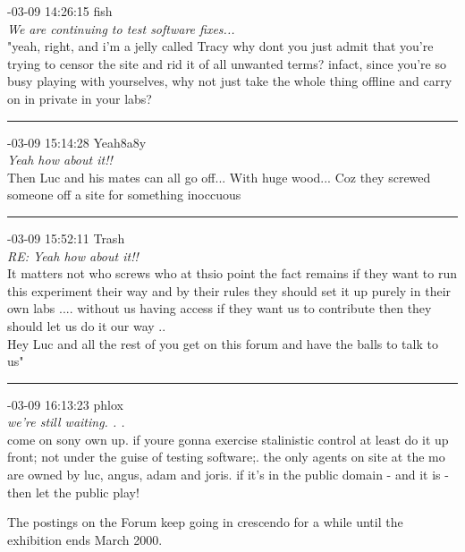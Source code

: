 \begin{mail}
{-03-09 14:26:15 fish}\\
{\itshape We are continuing to test software fixes...}\\
"yeah, right, and i'm a jelly called Tracy
why dont you just admit that you're trying to censor the site and rid it of all unwanted terms? infact, since you're so busy playing with yourselves, why not just take the whole thing offline and carry on in private in your labs?	\\

\rule{0.8\textwidth}{.4pt}

{-03-09 15:14:28 Yeah8a8y}\\
{\itshape Yeah how about it!!}\\
Then Luc and his mates can all go off... With huge wood... Coz they screwed someone off a site for something inoccuous\\


\rule{0.8\textwidth}{.4pt}


{-03-09 15:52:11 Trash}\\
{\itshape RE: Yeah how about it!!}\\
It matters not who screws who at thsio point the fact remains if they want to run this experiment their way and by their rules they should set it up purely in their own labs .... without us having access if they want us to contribute then they should let us do it our way ..\\
Hey Luc and all the rest of you get on this forum and have the balls to talk to us"\enlargethispage{1\baselineskip}\\

\rule{0.8\textwidth}{.4pt}

{-03-09 16:13:23 phlox}\\
{\itshape we're still waiting. . .}\\
come on sony own up. if youre gonna exercise stalinistic control at least do it up front; not under the guise of testing software;. the only agents on site at the mo are owned by luc, angus, adam and joris. if it's in the public domain - and it is -  then let the public play!
%
\end{mail}

The postings on the Forum keep going in crescendo for a while until the exhibition ends March 2000. 

